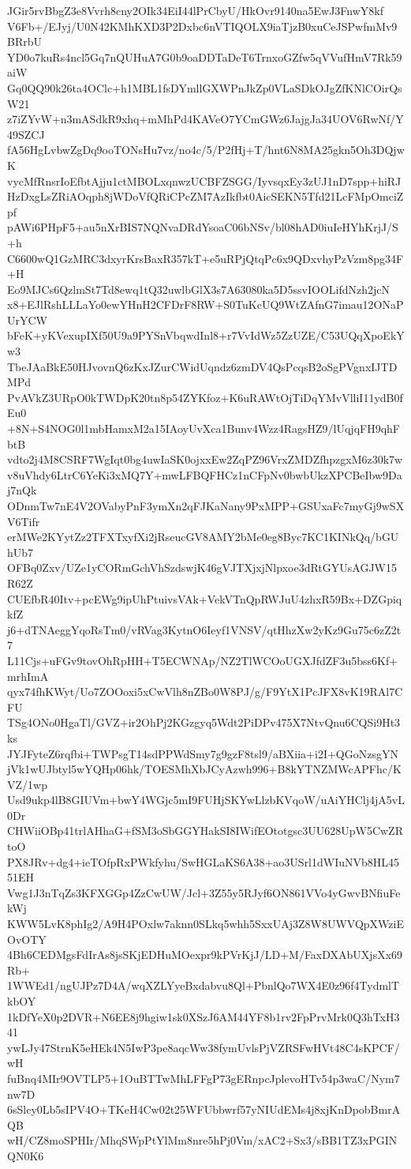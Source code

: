 JGir5rvBbgZ3e8Vvrh8cny2OIk34EiI44lPrCbyU/HkOvr9140na5EwJ3FnwY8kf
V6Fb+/EJyj/U0N42KMhKXD3P2Dxbc6nVTIQOLX9iaTjzB0xuCeJSPwfmMv9BRrbU
YD0o7kuRs4ncl5Gq7nQUHuA7G0b9oaDDTaDeT6TrnxoGZfw5qVVufHmV7Rk59aiW
Gq0QQ90k26ta4OClc+h1MBL1fsDYmllGXWPnJkZp0VLaSDkOJgZfKNlCOirQsW21
z7iZYvW+n3mASdkR9xhq+mMhPd4KAVeO7YCmGWz6JajgJa34UOV6RwNf/Y49SZCJ
fA56HgLvbwZgDq9ooTONsHu7vz/no4c/5/P2fHj+T/hnt6N8MA25gkn5Oh3DQjwK
vycMfRnsrIoEfbtAjju1ctMBOLxqnwzUCBFZSGG/IyvsqxEy3zUJ1nD7spp+hiRJ
HzDxgLsZRiAOqph8jWDoVfQRiCPcZM7AzIkfbt0AicSEKN5Tfd21LcFMpOmciZpf
pAWi6PHpF5+au5nXrBIS7NQNvaDRdYsoaC06bNSv/bl08hAD0iuIeHYhKrjJ/S+h
C6600wQ1GzMRC3dxyrKrsBaxR357kT+e5uRPjQtqPc6x9QDxvhyPzVzm8pg34F+H
Eo9MJCs6QzlmSt7Td8ewq1tQ32uwlbGlX3s7A63080ka5D5ssvIOOLifdNzh2jcN
x8+EJlRshLLLaYo0ewYHnH2CFDrF8RW+S0TuKcUQ9WtZAfnG7imau12ONaPUrYCW
bFeK+yKVexupIXf50U9a9PYSnVbqwdInl8+r7VvIdWz5ZzUZE/C53UQqXpoEkYw3
TbeJAaBkE50HJvovnQ6zKxJZurCWidUqndz6zmDV4QsPcqsB2oSgPVgnxIJTDMPd
PvAVkZ3URpO0kTWDpK20tn8p54ZYKfoz+K6uRAWtOjTiDqYMvVlliI11ydB0fEu0
+8N+S4NOG0l1mbHamxM2a15IAoyUvXca1Bunv4Wzz4RagsHZ9/lUqjqFH9qhFbtB
vdto2j4M8CSRF7WgIqt0bg4uwIaSK0ojxxEw2ZqPZ96VrxZMDZfhpzgxM6z30k7w
v8uVhdy6LtrC6YeKi3xMQ7Y+mwLFBQFHCz1nCFpNv0bwbUkzXPCBeIbw9Daj7nQk
ODnmTw7nE4V2OVabyPnF3ymXn2qFJKaNany9PxMPP+GSUxaFc7myGj9wSXV6Tifr
erMWe2KYytZz2TFXTxyfXi2jRseucGV8AMY2bMe0eg8Byc7KC1KINkQq/bGUhUb7
OFBq0Zxv/UZe1yCORmGchVhSzdswjK46gVJTXjxjNlpxoe3dRtGYUsAGJW15R62Z
CUEfbR40Itv+pcEWg9ipUhPtuivsVAk+VekVTnQpRWJuU4zhxR59Bx+DZGpiqkfZ
j6+dTNAeggYqoRsTm0/vRVag3KytnO6Ieyf1VNSV/qtHhzXw2yKz9Gu75c6zZ2t7
L11Cjs+uFGv9tovOhRpHH+T5ECWNAp/NZ2TlWCOoUGXJfdZF3u5bss6Kf+mrhImA
qyx74fhKWyt/Uo7ZOOoxi5xCwVlh8nZBo0W8PJ/g/F9YtX1PcJFX8vK19RAl7CFU
TSg4ONo0HgaTl/GVZ+ir2OhPj2KGzgyq5Wdt2PiDPv475X7NtvQnu6CQSi9Ht3ks
JYJFyteZ6rqfbi+TWPsgT14sdPPWdSmy7g9gzF8tsl9/aBXiia+i2I+QGoNzsgYN
jVk1wUJbtyl5wYQHp06hk/TOESMhXbJCyAzwh996+B8kYTNZMWcAPFhc/KVZ/1wp
Usd9ukp4lB8GIUVm+bwY4WGjc5mI9FUHjSKYwLlzbKVqoW/uAiYHClj4jA5vL0Dr
CHWiiOBp41trlAHhaG+fSM3oSbGGYHakSI8IWifEOtotgsc3UU628UpW5CwZRtoO
PX8JRv+dg4+ieTOfpRxPWkfyhu/SwHGLaKS6A38+ao3USrl1dWIuNVb8HL4551EH
Vwg1J3nTqZs3KFXGGp4ZzCwUW/Jcl+3Z55y5RJyf6ON861VVo4yGwvBNfiuFekWj
KWW5LvK8phIg2/A9H4POxlw7aknn0SLkq5whh5SxxUAj3Z8W8UWVQpXWziEOvOTY
4Bh6CEDMgsFdIrAs8jsSKjEDHuMOexpr9kPVrKjJ/LD+M/FaxDXAbUXjsXx69Rb+
1WWEd1/ngUJPz7D4A/wqXZLYyeBxdabvu8Ql+PbnlQo7WX4E0z96f4TydmlTkbOY
1kDfYeX0p2DVR+N6EE8j9hgiw1sk0XSzJ6AM44YF8b1rv2FpPrvMrk0Q3hTxH341
ywLJy47StrnK5eHEk4N5IwP3pe8aqcWw38fymUvlsPjVZRSFwHVt48C4sKPCF/wH
fuBnq4MIr9OVTLP5+1OuBTTwMhLFFgP73gERnpcJplevoHTv54p3waC/Nym7nw7D
6sSlcy0Lb5sIPV4O+TKeH4Cw02t25WFUbbwrf57yNIUdEMs4j8xjKnDpobBmrAQB
wH/CZ8moSPHIr/MhqSWpPtYlMm8nre5hPj0Vm/xAC2+Sx3/sBB1TZ3xPGINQN0K6
